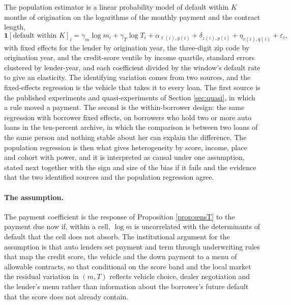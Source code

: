 The population estimator is a linear probability model of default within $K$ months of origination on the logarithms of the monthly payment and the contract length,
\begin{equation}
\label{eq:main_reg}
\mathbf{1}[\text{default within } K]_{i} = \gamma_m \log m_i + \gamma_T \log T_i + \alpha_{\ell(i), y(i)} + \delta_{z(i), y(i)} + \eta_{v(i), q(i)} + \varepsilon_{i},
\end{equation}
with fixed effects for the lender by origination year, the three-digit zip code by origination year, and the credit-score ventile by income quartile, standard errors clustered by lender-year, and each coefficient divided by the window's default rate to give an elasticity. The identifying variation comes from two sources, and the fixed-effects regression is the vehicle that takes it to every loan. The first source is the published experiments and quasi-experiments of Section \ref{sec:quasi}, in which a rule moved a payment. The second is the within-borrower design: the same regression with borrower fixed effects, on borrowers who hold two or more auto loans in the ten-percent archive, in which the comparison is between two loans of the same person and nothing stable about her can explain the difference. The population regression is then what gives heterogeneity by score, income, place and cohort with power, and it is interpreted as causal under one assumption, stated next together with the sign and size of the bias if it fails and the evidence that the two identified sources and the population regression agree.

\paragraph{The assumption.} The payment coefficient is the response of Proposition \ref{prop:sensT} to the payment due now if, within a cell, $\log m$ is uncorrelated with the determinants of default that the cell does not absorb. The institutional argument for the assumption is that auto lenders set payment and term through underwriting rules that map the credit score, the vehicle and the down payment to a menu of allowable contracts, so that conditional on the score band and the local market the residual variation in $(m, T)$ reflects vehicle choice, dealer negotiation and the lender's menu rather than information about the borrower's future default that the score does not already contain.


